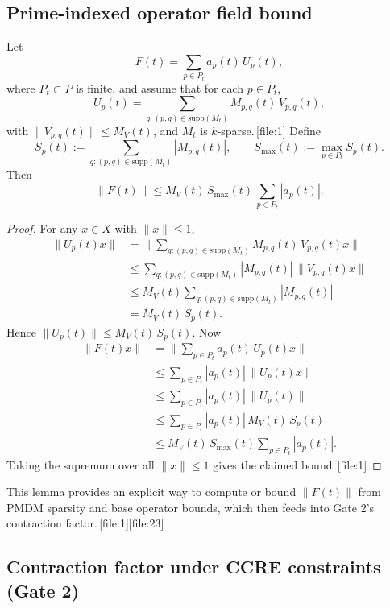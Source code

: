 \documentclass[11pt]{article}
\begin{document}
\subsection{Prime-indexed operator field bound}

\begin{lemma}
Let
\[
F(t) = \sum_{p\in P_t} a_p(t)\,U_p(t),
\]
where \(P_t\subset P\) is finite, and assume that for each \(p\in P_t\),
\[
U_p(t) = \sum_{q:(p,q)\in\mathrm{supp}(M_t)} M_{p,q}(t)\,V_{p,q}(t),
\]
with \(\|V_{p,q}(t)\|\le M_V(t)\), and \(M_t\) is \(k\)-sparse.\,[file:1]
Define
\[
S_p(t) := \sum_{q:(p,q)\in\mathrm{supp}(M_t)} |M_{p,q}(t)|,\qquad
S_{\max}(t) := \max_{p\in P_t} S_p(t).
\]
Then
\[
\|F(t)\|\le M_V(t)\,S_{\max}(t)\,\sum_{p\in P_t}|a_p(t)|.
\]
\end{lemma}

\begin{proof}
For any \(x\in X\) with \(\|x\|\le 1\),
\begin{align*}
\|U_p(t)x\|
&= \Big\|\sum_{q:(p,q)\in\mathrm{supp}(M_t)} M_{p,q}(t)\,V_{p,q}(t)x\Big\| \\
&\le \sum_{q:(p,q)\in\mathrm{supp}(M_t)} |M_{p,q}(t)|\,\|V_{p,q}(t)x\| \\
&\le M_V(t)\sum_{q:(p,q)\in\mathrm{supp}(M_t)} |M_{p,q}(t)| \\
&= M_V(t)\,S_p(t).
\end{align*}
Hence \(\|U_p(t)\|\le M_V(t)\,S_p(t)\).
Now
\begin{align*}
\|F(t)x\|
&= \Big\|\sum_{p\in P_t} a_p(t)\,U_p(t)x\Big\| \\
&\le \sum_{p\in P_t}|a_p(t)|\,\|U_p(t)x\| \\
&\le \sum_{p\in P_t}|a_p(t)|\,\|U_p(t)\| \\
&\le \sum_{p\in P_t}|a_p(t)|\,M_V(t)\,S_p(t) \\
&\le M_V(t)\,S_{\max}(t)\sum_{p\in P_t}|a_p(t)|.
\end{align*}
Taking the supremum over all \(\|x\|\le 1\) gives the claimed bound.\,[file:1]
\end{proof}

This lemma provides an explicit way to compute or bound \(\|F(t)\|\) from PMDM sparsity and base operator bounds, which then feeds into Gate 2’s contraction factor.\,[file:1][file:23]

\subsection{Contraction factor under CCRE constraints (Gate 2)}
\end{document}

